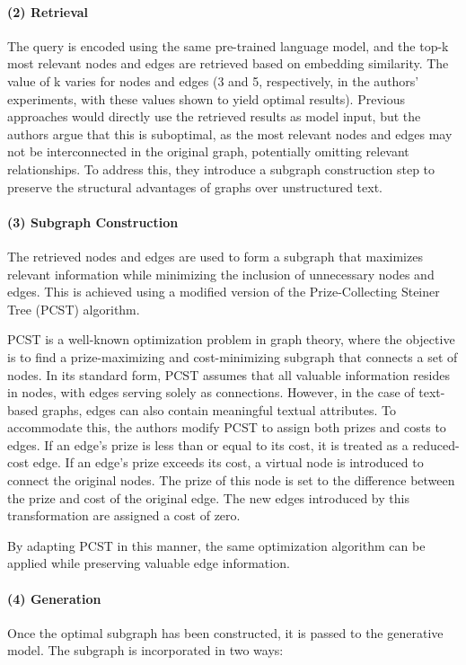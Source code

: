 \paragraph{(2) Retrieval} The query is encoded using the same pre-trained language model, and the top-k most relevant nodes and edges are retrieved based on embedding similarity.
The value of k varies for nodes and edges (3 and 5, respectively, in the authors' experiments, with these values shown to yield optimal results).
Previous approaches would directly use the retrieved results as model input, but the authors argue that this is suboptimal, as the most relevant nodes and edges may not be interconnected in the original graph, potentially omitting relevant relationships.
To address this, they introduce a subgraph construction step to preserve the structural advantages of graphs over unstructured text.



\paragraph{(3) Subgraph Construction} The retrieved nodes and edges are used to form a subgraph that maximizes relevant information while minimizing the inclusion of unnecessary nodes and edges.
This is achieved using a modified version of the Prize-Collecting Steiner Tree (PCST) algorithm.

PCST is a well-known optimization problem in graph theory, where the objective is to find a prize-maximizing and cost-minimizing subgraph that connects a set of nodes.
In its standard form, PCST assumes that all valuable information resides in nodes, with edges serving solely as connections.
However, in the case of text-based graphs, edges can also contain meaningful textual attributes.
To accommodate this, the authors modify PCST to assign both prizes and costs to edges.
If an edge's prize is less than or equal to its cost, it is treated as a reduced-cost edge.
If an edge's prize exceeds its cost, a virtual node is introduced to connect the original nodes. The prize of this node is set to the difference between the prize and cost of the original edge. The new edges introduced by this transformation are assigned a cost of zero.

By adapting PCST in this manner, the same optimization algorithm can be applied while preserving valuable edge information.

\paragraph{(4) Generation} Once the optimal subgraph has been constructed, it is passed to the generative model. The subgraph is incorporated in two ways:

